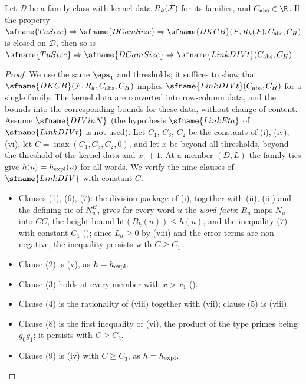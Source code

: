 \begin{proposition}\label{pf:top-shape:divmain}
Let $\mathcal D$ be a family class with kernel data $R_k(\mathcal{F})$ for its families, and $C_{\rm abs}\in\R$. If
the property $\sfname{TuSize}\Rightarrow\sfname{DGamSize}\Rightarrow\sfname{DKCB}(\topshapeF,R_k(\topshapeF),
C_{\rm abs},C_H)$ is closed on $\mathcal D$, then so is $\sfname{TuSize}\Rightarrow\sfname{DGamSize}\Rightarrow
\sfname{LinkDIVt}(C_{\rm abs},C_H)$.
\end{proposition}

\begin{proof}
We use the same $\eps_1$ and thresholds; it suffices to show that $\sfname{DKCB}(\topshapeF,R_k,C_{\rm abs},C_H)$
implies $\sfname{LinkDIVt}(C_{\rm abs},C_H)$ for a single family. The kernel data are converted into row-column
data, and the bounds into the corresponding bounds for these data, without change of content. Assume
$\sfname{DIVinN}$ (the hypothesis $\sfname{LinkEta}$ of $\sfname{LinkDIVt}$ is not used). Let $C_1$, $C_3$, $C_2$ be
the constants of (i), (iv), (vi), let $C=\max(C_1,C_3,C_2,0)$, and let $x$ be beyond all thresholds, beyond the
threshold of the kernel data and $x_1+1$. At a member $(D,L)$ the family ties give $h(u)=h_{\rm expl}(u)$ for all
words. We verify the nine clauses of $\sfname{LinkDIV}$ with constant $C$.
\begin{itemize}
\item Clauses (1), (6), (7): the division package of (i), together with (ii), (iii) and the defining tie of
$N^H_u$, gives for every word $u$ the \emph{word facts}: $B_u$ maps $N_u$ into $\mathit{CC}$, the height bound
$\mathrm{ht}(B_k(u))\le h(u)$, and the inequality (7) with constant $C_1$
(); since $L_a\ge0$ by (viii) and the error terms are
non-negative, the inequality persists with $C\ge C_1$.
\item Clause (2) is (v), as $h=h_{\rm expl}$.
\item Clause (3) holds at every member with $x>x_1$ ().
\item Clause (4) is the rationality of (viii) together with (vii); clause (5) is (viii).
\item Clause (8) is the first inequality of (vi), the product of the type primes being $g_0g_1$; it persists with
$C\ge C_2$.
\item Clause (9) is (iv) with $C\ge C_3$, as $h=h_{\rm expl}$.\qedhere
\end{itemize}
\end{proof}

